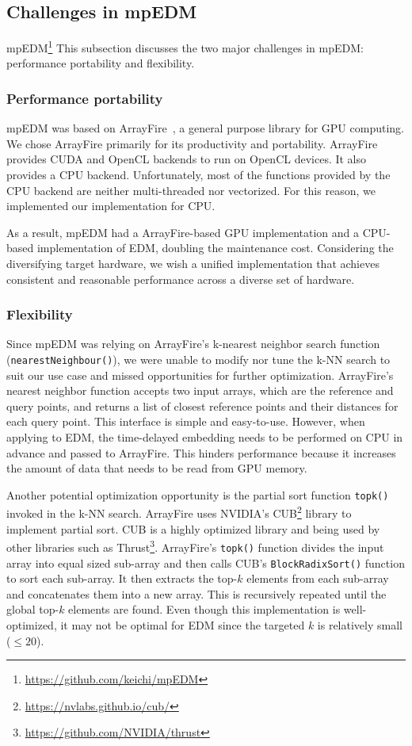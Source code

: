 \documentclass[conference]{IEEEtran}
\begin{document}
\subsection{Challenges in mpEDM}\label{sec:challenges}

mpEDM\footnote{\url{https://github.com/keichi/mpEDM}}
This subsection discusses the two major challenges in mpEDM: performance
portability and flexibility.

\subsubsection{Performance portability}

mpEDM was based on ArrayFire~\cite{Malcolm2012}, a general purpose library for
GPU computing. We chose ArrayFire primarily for its productivity and
portability. ArrayFire provides CUDA and OpenCL backends to run on OpenCL
devices. It also provides a CPU backend. Unfortunately, most of the functions
provided by the CPU backend are neither multi-threaded nor vectorized. For this
reason, we implemented our implementation for CPU\@.

As a result, mpEDM had a ArrayFire-based GPU implementation and a CPU-based
implementation of EDM, doubling the maintenance cost. Considering the
diversifying target hardware, we wish a unified implementation that achieves
consistent and reasonable performance across a diverse set of hardware.

\subsubsection{Flexibility}

Since mpEDM was relying on ArrayFire's k-nearest neighbor search function
(\texttt{nearestNeighbour()}), we were unable to modify nor tune the k-NN
search to suit our use case and missed opportunities for further optimization.
ArrayFire's nearest neighbor function accepts two input arrays, which are the
reference and query points, and returns a list of closest reference points and
their distances for each query point. This interface is simple and
easy-to-use. However, when applying to EDM, the time-delayed embedding needs
to be performed on CPU in advance and passed to ArrayFire. This hinders
performance because it increases the amount of data that needs to be read from
GPU memory.

Another potential optimization opportunity is the partial sort function
\texttt{topk()} invoked in the k-NN search. ArrayFire uses NVIDIA's
CUB\footnote{\url{https://nvlabs.github.io/cub/}} library to implement partial
sort. CUB is a highly optimized library and being used by other libraries such
as Thrust\footnote{\url{https://github.com/NVIDIA/thrust}}. ArrayFire's
\texttt{topk()} function divides the input array into equal sized sub-array
and then calls CUB's \texttt{BlockRadixSort()} function to sort each
sub-array. It then extracts the top-$k$ elements from each sub-array and
concatenates them into a new array. This is recursively repeated until the
global top-$k$ elements are found. Even though this implementation is
well-optimized, it may not be optimal for EDM since the targeted $k$ is
relatively small ($\leq 20$).
\end{document}
